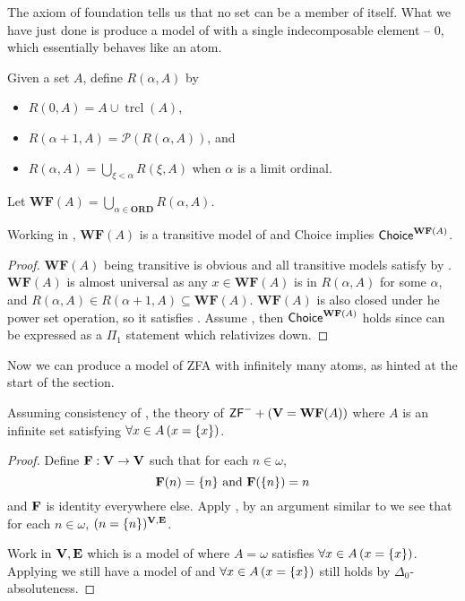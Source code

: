 \newcommand{\WF}{\mathbf{WF}}
\newcommand{\trcl}{\operatorname{trcl}}
The axiom of foundation tells us that no set can be a member of itself.
What we have just done is produce a model of \ZFCminus with a single indecomposable element -- \(0\), which essentially behaves like an atom.

\begin{definition}
    Given a set \(A\), define \(R(\alpha,A)\) by
    \begin{itemize}
        \item \(R(0,A) = A \cup \operatorname{trcl}(A)\),
        \item \(R(\alpha+1, A) = \mathcal{P}(R(\alpha, A))\), and
        \item \(R(\alpha, A) = \bigcup_{\xi<\alpha} R(\xi, A)\) when \(\alpha\) is a limit ordinal.
    \end{itemize}
    Let \(\WF(A) = \bigcup_{\alpha\in\mathbf{ORD}} R(\alpha, A)\).
\end{definition}

\begin{lemma} \label{WFfromA}
    Working in \ZFminus, \(\WF(A)\) is a transitive model of \ZFminus and {\normalfont\textsf{Choice}} implies \({\normalfont\textsf{Choice}}^{\WF(A)}\).
\end{lemma}
\begin{proof}
    \(\WF(A)\) being transitive is obvious and all transitive models satisfy  by .
    \(\WF(A)\) is almost universal as any \(x\in\WF(A)\) is in \(R(\alpha,A)\) for some \(\alpha\),
    and \(R(\alpha,A)\in R(\alpha+1,A)\subseteq \WF(A)\).
    \(\WF(A)\) is also closed under he power set operation, so it satisfies .
    Assume , then \(\Axiom{Choice}^{\WF(A)}\) holds since  can be expressed as a \(\Pi_1\) statement which relativizes down.
\end{proof}

Now we can produce a model of \textsf{ZFA} with infinitely many atoms, as hinted at the start of the section.
\begin{theorem}
    Assuming consistency of \ZFminus, the theory of \(\ZFminus + (\V=\WF(A))\) where \(A\) is an infinite set satisfying \(\forall x\in A\left(x = {\left\{ x \right\}}\right)\).
\end{theorem}
\begin{proof}
    Define \(\mathbf{F}:\mathbf{V}\to\mathbf{V}\) such that for each \(n\in\omega\),
    \[ \mathbf{F}(n) = {\left\{ n \right\}} \text{ and } \mathbf{F}({\left\{ n \right\}}) = n \]
    and \(\mathbf{F}\) is identity everywhere else.
    Apply , by an argument similar to  we see that for each \(n\in\omega\), \((n = {\left\{ n \right\}})^{\mathbf{V},\mathbf{E}}\).

    Work in \(\mathbf{V},\mathbf{E}\) which is a model of \ZFminus where \(A = \omega\) satisfies \(\forall x\in A\left(x = {\left\{ x \right\}}\right)\).
    Applying  we still have a model of \ZFminus and \(\forall x\in A\left(x = {\left\{ x \right\}}\right)\) still holds by \(\Delta_0\)-absoluteness.
\end{proof}

